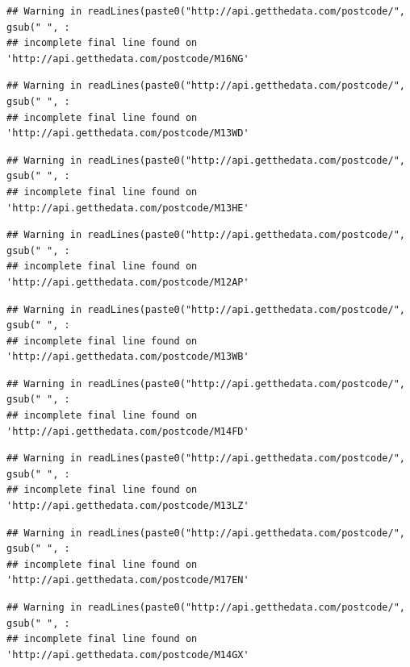 \documentclass[]{book}
\begin{document}
\begin{verbatim}
## Warning in readLines(paste0("http://api.getthedata.com/postcode/", gsub(" ", :
## incomplete final line found on 'http://api.getthedata.com/postcode/M16NG'
\end{verbatim}

\begin{verbatim}
## Warning in readLines(paste0("http://api.getthedata.com/postcode/", gsub(" ", :
## incomplete final line found on 'http://api.getthedata.com/postcode/M13WD'
\end{verbatim}

\begin{verbatim}
## Warning in readLines(paste0("http://api.getthedata.com/postcode/", gsub(" ", :
## incomplete final line found on 'http://api.getthedata.com/postcode/M13HE'
\end{verbatim}

\begin{verbatim}
## Warning in readLines(paste0("http://api.getthedata.com/postcode/", gsub(" ", :
## incomplete final line found on 'http://api.getthedata.com/postcode/M12AP'
\end{verbatim}

\begin{verbatim}
## Warning in readLines(paste0("http://api.getthedata.com/postcode/", gsub(" ", :
## incomplete final line found on 'http://api.getthedata.com/postcode/M13WB'
\end{verbatim}

\begin{verbatim}
## Warning in readLines(paste0("http://api.getthedata.com/postcode/", gsub(" ", :
## incomplete final line found on 'http://api.getthedata.com/postcode/M14FD'
\end{verbatim}

\begin{verbatim}
## Warning in readLines(paste0("http://api.getthedata.com/postcode/", gsub(" ", :
## incomplete final line found on 'http://api.getthedata.com/postcode/M13LZ'
\end{verbatim}

\begin{verbatim}
## Warning in readLines(paste0("http://api.getthedata.com/postcode/", gsub(" ", :
## incomplete final line found on 'http://api.getthedata.com/postcode/M17EN'
\end{verbatim}

\begin{verbatim}
## Warning in readLines(paste0("http://api.getthedata.com/postcode/", gsub(" ", :
## incomplete final line found on 'http://api.getthedata.com/postcode/M14GX'
\end{verbatim}
\end{document}
